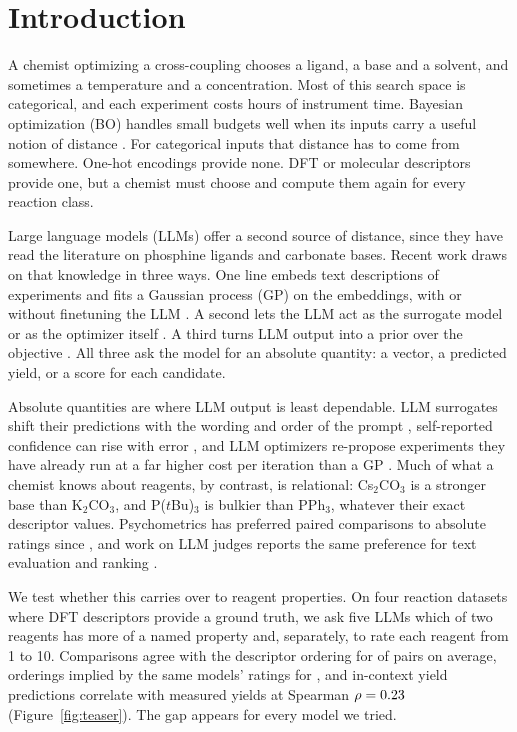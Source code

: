 \section{Introduction}
\label{sec:intro}

A chemist optimizing a cross-coupling chooses a ligand, a base and a solvent, and sometimes a temperature and a concentration. Most of this search space is categorical, and each experiment costs hours of instrument time. Bayesian optimization (BO) handles small budgets well when its inputs carry a useful notion of distance \citep{shields2021bayesian}. For categorical inputs that distance has to come from somewhere. One-hot encodings provide none. DFT or molecular descriptors provide one, but a chemist must choose and compute them again for every reaction class.

Large language models (LLMs) offer a second source of distance, since they have read the literature on phosphine ligands and carbonate bases. Recent work draws on that knowledge in three ways. One line embeds text descriptions of experiments and fits a Gaussian process (GP) on the embeddings, with or without finetuning the LLM \citep{kristiadi2024sober,rankovic2026gollum}. A second lets the LLM act as the surrogate model or as the optimizer itself \citep{liu2024llambo,ramos2026boicl,macknight2025pretrained}. A third turns LLM output into a prior over the objective \citep{yuan2026lgbo,chen2026caliper}. All three ask the model for an absolute quantity: a vector, a predicted yield, or a score for each candidate.

Absolute quantities are where LLM output is least dependable. LLM surrogates shift their predictions with the wording and order of the prompt \citep{lei2026elicitation}, self-reported confidence can rise with error \citep{chen2026caliper}, and LLM optimizers re-propose experiments they have already run at a far higher cost per iteration than a GP \citep{macknight2025pretrained}. Much of what a chemist knows about reagents, by contrast, is relational: Cs$_2$CO$_3$ is a stronger base than K$_2$CO$_3$, and P($t$Bu)$_3$ is bulkier than PPh$_3$, whatever their exact descriptor values. Psychometrics has preferred paired comparisons to absolute ratings since \citet{thurstone1927law}, and work on LLM judges reports the same preference for text evaluation and ranking \citep{liusie2024comparative,qin2024prp}.

We test whether this carries over to reagent properties. On four reaction datasets where DFT descriptors provide a ground truth, we ask five LLMs which of two reagents has more of a named property and, separately, to rate each reagent from 1 to 10. Comparisons agree with the descriptor ordering for \PairAccPct{} of pairs on average, orderings implied by the same models' ratings for \RateAccPct{}, and in-context yield predictions correlate with measured yields at Spearman $\rho=0.23$ (Figure~\ref{fig:teaser}). The gap appears for every model we tried.

